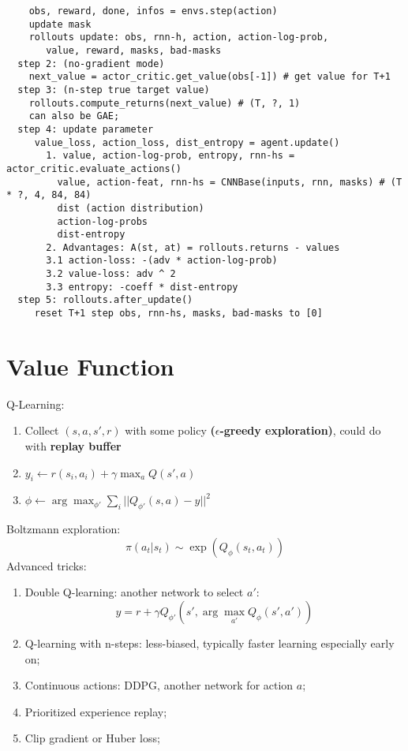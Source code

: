 \documentclass{article}
\begin{document}
\begin{enumerate}
\begin{verbatim}
    obs, reward, done, infos = envs.step(action)
    update mask
    rollouts update: obs, rnn-h, action, action-log-prob,
       value, reward, masks, bad-masks
  step 2: (no-gradient mode)
    next_value = actor_critic.get_value(obs[-1]) # get value for T+1
  step 3: (n-step true target value)
    rollouts.compute_returns(next_value) # (T, ?, 1)
    can also be GAE;
  step 4: update parameter
     value_loss, action_loss, dist_entropy = agent.update()
       1. value, action-log-prob, entropy, rnn-hs = actor_critic.evaluate_actions()
         value, action-feat, rnn-hs = CNNBase(inputs, rnn, masks) # (T * ?, 4, 84, 84)
         dist (action distribution)
         action-log-probs
         dist-entropy
       2. Advantages: A(st, at) = rollouts.returns - values
       3.1 action-loss: -(adv * action-log-prob)
       3.2 value-loss: adv ^ 2
       3.3 entropy: -coeff * dist-entropy
  step 5: rollouts.after_update()
     reset T+1 step obs, rnn-hs, masks, bad-masks to [0]
\end{verbatim}
\end{enumerate}

\section{Value Function}
Q-Learning:
\begin{enumerate}
\item Collect $(s, a, s', r)$ with some policy \textbf{($\epsilon$-greedy exploration)}, could do with \textbf{replay buffer}
\item $y_i\leftarrow r(s_i, a_i)+\gamma\max_a Q(s',a)$
\item $\phi\leftarrow\arg\max_{\phi'}\sum_i||Q_{\phi'}(s,a)-y||^2$
\end{enumerate}
Boltzmann exploration:
\begin{equation*}
\pi(a_t|s_t)\sim\exp(Q_{\phi}(s_t, a_t))
\end{equation*}
Advanced tricks:
\begin{enumerate}
\item Double Q-learning: another network to select $a'$:
\begin{equation}
y = r + \gamma Q_{\phi'}(s', \arg\max_{a'}Q_{\phi}(s', a'))
\end{equation}
\item Q-learning with n-steps: less-biased, typically faster learning especially early on;
\item Continuous actions: DDPG, another network for action $a$;
\item Prioritized experience replay;
\item Clip gradient or Huber loss;
\end{enumerate}
\end{document}
